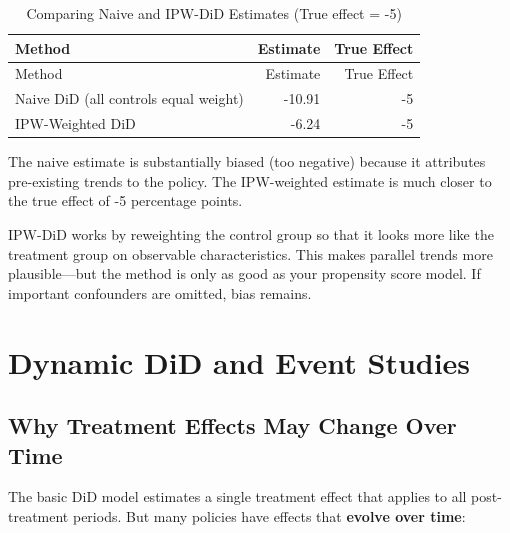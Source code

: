\documentclass[
  letterpaper,
  DIV=11,
  numbers=noendperiod]{scrreprt}
\begin{document}
\begin{longtable}[]{@{}lrr@{}}
\caption{Comparing Naive and IPW-DiD Estimates (True effect =
-5)}\tabularnewline
\toprule\noalign{}
Method & Estimate & True Effect \\
\midrule\noalign{}
\endfirsthead
\toprule\noalign{}
Method & Estimate & True Effect \\
\midrule\noalign{}
\endhead
\bottomrule\noalign{}
\endlastfoot
Naive DiD (all controls equal weight) & -10.91 & -5 \\
IPW-Weighted DiD & -6.24 & -5 \\
\end{longtable}

The naive estimate is substantially biased (too negative) because it
attributes pre-existing trends to the policy. The IPW-weighted estimate
is much closer to the true effect of -5 percentage points.

\begin{tcolorbox}[enhanced jigsaw, arc=.35mm, bottomrule=.15mm, bottomtitle=1mm, breakable, colback=white, colbacktitle=quarto-callout-important-color!10!white, colframe=quarto-callout-important-color-frame, coltitle=black, left=2mm, leftrule=.75mm, opacityback=0, opacitybacktitle=0.6, rightrule=.15mm, title=\textcolor{quarto-callout-important-color}{\faExclamation}\hspace{0.5em}{Key Insight}, titlerule=0mm, toprule=.15mm, toptitle=1mm]

IPW-DiD works by reweighting the control group so that it looks more
like the treatment group on observable characteristics. This makes
parallel trends more plausible---but the method is only as good as your
propensity score model. If important confounders are omitted, bias
remains.

\end{tcolorbox}

\section{Dynamic DiD and Event
Studies}\label{dynamic-did-and-event-studies}

\subsection{Why Treatment Effects May Change Over
Time}\label{why-treatment-effects-may-change-over-time}

The basic DiD model estimates a single treatment effect that applies to
all post-treatment periods. But many policies have effects that
\textbf{evolve over time}:
\end{document}
